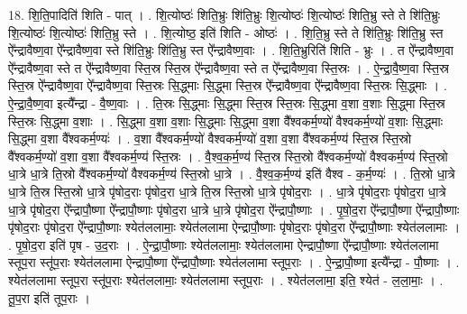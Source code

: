 \documentclass[17pt]{extarticle}
\begin{document}
18. शि॒ति॒पादिति॑ शिति - पात् । . शि॒त्योष्ठः॑ शिति॒भ्रुः शि॑ति॒भ्रुः शि॒त्योष्ठः॑ शि॒त्योष्ठः॑ शिति॒भ्रु स्ते ते शि॑ति॒भ्रुः शि॒त्योष्ठः॑ शि॒त्योष्ठः॑ शिति॒भ्रु स्ते । . शि॒त्योष्ठ॒ इति॑ शिति - ओष्ठः॑ । . शि॒ति॒भ्रु स्ते ते शि॑ति॒भ्रुः शि॑ति॒भ्रु स्त ऐ᳚न्द्रावैष्ण॒वा ऐ᳚न्द्रावैष्ण॒वा स्ते शि॑ति॒भ्रुः शि॑ति॒भ्रु स्त ऐ᳚न्द्रावैष्ण॒वाः । . शि॒ति॒भ्रुरिति॑ शिति - भ्रुः । . त ऐ᳚न्द्रावैष्ण॒वा ऐ᳚न्द्रावैष्ण॒वा स्ते त ऐ᳚न्द्रावैष्ण॒वा स्ति॒स्र स्ति॒स्र ऐ᳚न्द्रावैष्ण॒वा स्ते त ऐ᳚न्द्रावैष्ण॒वा स्ति॒स्रः । . ऐ॒न्द्रा॒वै॒ष्ण॒वा स्ति॒स्र स्ति॒स्र ऐ᳚न्द्रावैष्ण॒वा ऐ᳚न्द्रावैष्ण॒वा स्ति॒स्रः सि॒द्ध्माः सि॒द्ध्मा स्ति॒स्र ऐ᳚न्द्रावैष्ण॒वा ऐ᳚न्द्रावैष्ण॒वा स्ति॒स्रः सि॒द्ध्माः । . ऐ॒न्द्रा॒वै॒ष्ण॒वा इत्यै᳚न्द्रा - वै॒ष्ण॒वाः । . ति॒स्रः सि॒द्ध्माः सि॒द्ध्मा स्ति॒स्र स्ति॒स्रः सि॒द्ध्मा व॒शा व॒शाः सि॒द्ध्मा स्ति॒स्र स्ति॒स्रः सि॒द्ध्मा व॒शाः । . सि॒द्ध्मा व॒शा व॒शाः सि॒द्ध्माः सि॒द्ध्मा व॒शा वै᳚श्वकर्म॒ण्यो॑ वैश्वकर्म॒ण्यो॑ व॒शाः सि॒द्ध्माः सि॒द्ध्मा व॒शा वै᳚श्वकर्म॒ण्यः॑ । . व॒शा वै᳚श्वकर्म॒ण्यो॑ वैश्वकर्म॒ण्यो॑ व॒शा व॒शा वै᳚श्वकर्म॒ण्य॑ स्ति॒स्र स्ति॒स्रो वै᳚श्वकर्म॒ण्यो॑ व॒शा व॒शा वै᳚श्वकर्म॒ण्य॑ स्ति॒स्रः । . वै॒श्व॒क॒र्म॒ण्य॑ स्ति॒स्र स्ति॒स्रो वै᳚श्वकर्म॒ण्यो॑ वैश्वकर्म॒ण्य॑ स्ति॒स्रो धा॒त्रे धा॒त्रे ति॒स्रो वै᳚श्वकर्म॒ण्यो॑ वैश्वकर्म॒ण्य॑ स्ति॒स्रो धा॒त्रे । . वै॒श्व॒क॒र्म॒ण्य॑ इति॑ वैश्व - क॒र्म॒ण्यः॑ । . ति॒स्रो धा॒त्रे धा॒त्रे ति॒स्र स्ति॒स्रो धा॒त्रे पृ॑षोद॒राः पृ॑षोद॒रा धा॒त्रे ति॒स्र स्ति॒स्रो धा॒त्रे पृ॑षोद॒राः । . धा॒त्रे पृ॑षोद॒राः पृ॑षोद॒रा धा॒त्रे धा॒त्रे पृ॑षोद॒रा ऐ᳚न्द्रापौ॒ष्णा ऐ᳚न्द्रापौ॒ष्णाः पृ॑षोद॒रा धा॒त्रे धा॒त्रे पृ॑षोद॒रा ऐ᳚न्द्रापौ॒ष्णाः । . पृ॒षो॒द॒रा ऐ᳚न्द्रापौ॒ष्णा ऐ᳚न्द्रापौ॒ष्णाः पृ॑षोद॒राः पृ॑षोद॒रा ऐ᳚न्द्रापौ॒ष्णाः श्येत॑ललामाः॒ श्येत॑ललामा ऐन्द्रापौ॒ष्णाः पृ॑षोद॒राः पृ॑षोद॒रा ऐ᳚न्द्रापौ॒ष्णाः श्येत॑ललामाः । . पृ॒षो॒द॒रा इति॑ पृष - उ॒द॒राः । . ऐ॒न्द्रा॒पौ॒ष्णाः श्येत॑ललामाः॒ श्येत॑ललामा ऐन्द्रापौ॒ष्णा ऐ᳚न्द्रापौ॒ष्णाः श्येत॑ललामा स्तूप॒रा स्तू॑प॒राः श्येत॑ललामा ऐन्द्रापौ॒ष्णा ऐ᳚न्द्रापौ॒ष्णाः श्येत॑ललामा स्तूप॒राः । . ऐ॒न्द्रा॒पौ॒ष्णा इत्यै᳚न्द्रा - पौ॒ष्णाः । . श्येत॑ललामा स्तूप॒रा स्तू॑प॒राः श्येत॑ललामाः॒ श्येत॑ललामा स्तूप॒राः । . श्येत॑ललामा॒ इति॒ श्येत॑ - ल॒ला॒माः॒ । . तू॒प॒रा इति॑ तूप॒राः । \newline
\pagebreak
{}
\end{document}

